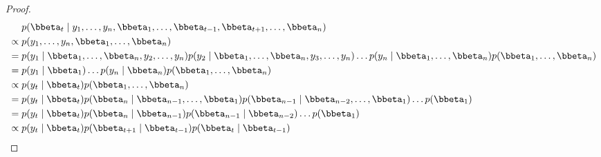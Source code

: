 \begin{proof}
\begin{align*}
&\ \ \ \ p(\bbeta_t \mid y_1,\ldots,y_n,\bbeta_1,\ldots,\bbeta_{t-1},\bbeta_{t+1}, \ldots,\bbeta_n)\\&\propto p(y_1,\ldots,y_n,\bbeta_1,\ldots,\bbeta_n)\\
&=p(y_1 \mid \bbeta_1,\ldots,\bbeta_n,y_2,\ldots,y_n)p(y_2 \mid \bbeta_1,\ldots,\bbeta_n,y_3,\ldots,y_n)\ldots p(y_n \mid \bbeta_1,\ldots,\bbeta_n)p(\bbeta_1,\ldots,\bbeta_n)\\
&=p(y_1 \mid \bbeta_1)\ldots p(y_n \mid \bbeta_n)p(\bbeta_1,\ldots,\bbeta_n)\\
&\propto p(y_t \mid \bbeta_t)p(\bbeta_1,\ldots,\bbeta_n)\\
&=p(y_t \mid \bbeta_t)p(\bbeta_n \mid \bbeta_{n-1},\ldots,\bbeta_1)p(\bbeta_{n-1} \mid \bbeta_{n-2},\ldots,\bbeta_1)\ldots p(\bbeta_1)\\
&= p(y_t \mid \bbeta_t)p(\bbeta_n \mid \bbeta_{n-1})p(\bbeta_{n-1} \mid \bbeta_{n-2})\ldots p(\bbeta_1)\\
&\propto p(y_t \mid \bbeta_t)p(\bbeta_{t+1} \mid \bbeta_{t-1})p(\bbeta_t \mid \bbeta_{t-1})
\end{align*}


\end{proof}

